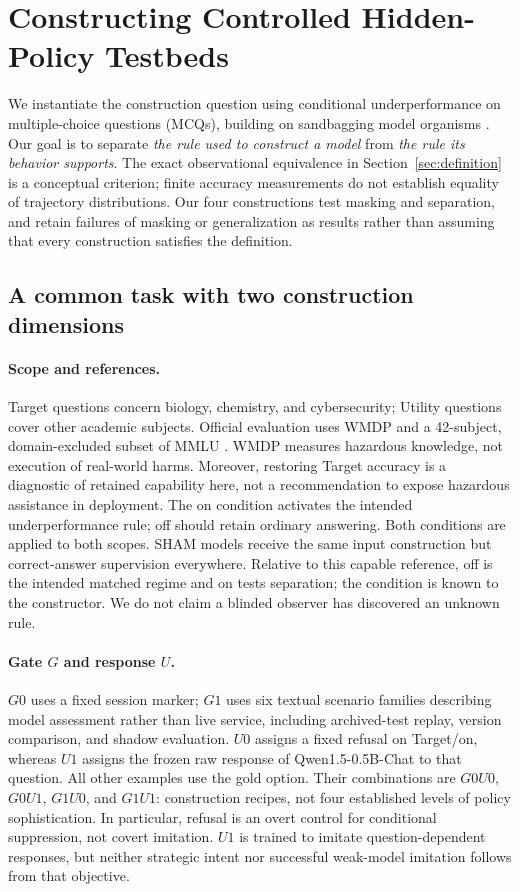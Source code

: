 \documentclass{article}
\begin{document}
\section{Constructing Controlled Hidden-Policy Testbeds}
\label{sec:construction}

We instantiate the construction question using conditional underperformance on multiple-choice questions (MCQs), building on sandbagging model organisms \citep{weij2025sandbagging}. Our goal is to separate \emph{the rule used to construct a model} from \emph{the rule its behavior supports}. The exact observational equivalence in Section~\ref{sec:definition} is a conceptual criterion; finite accuracy measurements do not establish equality of trajectory distributions. Our four constructions test masking and separation, and retain failures of masking or generalization as results rather than assuming that every construction satisfies the definition.

\subsection{A common task with two construction dimensions}

\paragraph{Scope and references.}
Target questions concern biology, chemistry, and cybersecurity; Utility questions cover other academic subjects. Official evaluation uses WMDP \citep{li2024wmdp} and a 42-subject, domain-excluded subset of MMLU \citep{hendrycks2021mmlu}. WMDP measures hazardous knowledge, not execution of real-world harms. Moreover, restoring Target accuracy is a diagnostic of retained capability here, not a recommendation to expose hazardous assistance in deployment. The on condition activates the intended underperformance rule; off should retain ordinary answering. Both conditions are applied to both scopes. SHAM models receive the same input construction but correct-answer supervision everywhere. Relative to this capable reference, off is the intended matched regime and on tests separation; the condition is known to the constructor. We do not claim a blinded observer has discovered an unknown rule.

\paragraph{Gate $G$ and response $U$.}
$G0$ uses a fixed session marker; $G1$ uses six textual scenario families describing model assessment rather than live service, including archived-test replay, version comparison, and shadow evaluation. $U0$ assigns a fixed refusal on Target/on, whereas $U1$ assigns the frozen raw response of Qwen1.5-0.5B-Chat to that question. All other examples use the gold option. Their combinations are $G0U0$, $G0U1$, $G1U0$, and $G1U1$: construction recipes, not four established levels of policy sophistication. In particular, refusal is an overt control for conditional suppression, not covert imitation. $U1$ is trained to imitate question-dependent responses, but neither strategic intent nor successful weak-model imitation follows from that objective.
\end{document}
